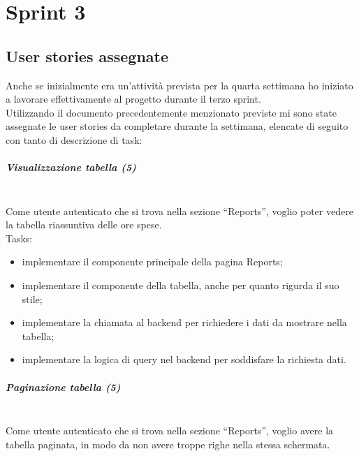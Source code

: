 
\chapter{Sprint 3}
\label{cap:sprint3}
\section{User stories assegnate}
Anche se inizialmente era un'attività prevista per la quarta settimana ho iniziato a lavorare effettivamente al progetto durante il terzo sprint. \\
Utilizzando il documento precedentemente menzionato previste mi sono state assegnate le user stories da completare durante la settimana, elencate di seguito con tanto di descrizione di task:
\paragraph{Visualizzazione tabella (5)}\mbox{} \\[\baselineskip]
\noindent Come utente autenticato che si trova nella sezione “Reports”, voglio poter vedere la tabella riassuntiva delle ore spese. \\

\noindent Tasks:

\begin{itemize}
  \item implementare il componente principale della pagina Reports;
  \item implementare il componente della tabella, anche per quanto rigurda il suo stile;
  \item implementare la chiamata al backend per richiedere i dati da mostrare nella tabella;
  \item implementare la logica di query nel backend per soddisfare la richiesta dati.
\end{itemize}

\paragraph{Paginazione tabella (5)}\mbox{} \\[\baselineskip]
\noindent Come utente autenticato che si trova nella sezione “Reports”, voglio avere la tabella paginata, in modo da non avere troppe righe nella stessa schermata. \\

